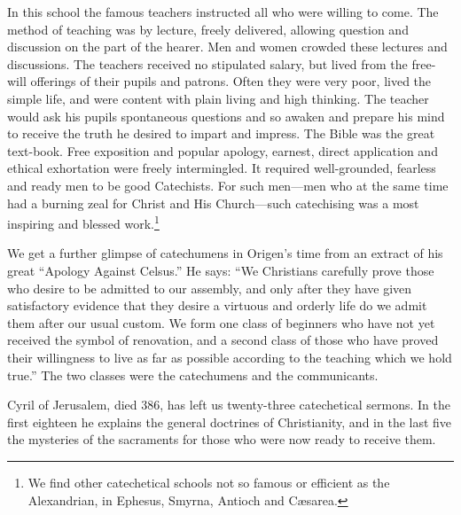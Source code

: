In this school the famous teachers instructed all who were willing to come. The method of teaching was by lecture, freely delivered, allowing question and discussion on the part of the hearer. Men and women crowded these lectures and discussions. The teachers received no stipulated salary, but lived from the free-will offerings of their pupils and patrons. Often they were very poor, lived the simple life, and were content with plain living and high thinking. The teacher would ask his pupils spontaneous questions and so awaken and prepare his mind to receive the truth he desired to impart and impress. The Bible was the great text-book. Free exposition and popular apology, earnest, direct application and ethical exhortation were freely intermingled. It required well-grounded, fearless and ready men to be good Catechists. For such men—men who at the same time had a burning zeal for
Christ and His Church—such catechising was a most inspiring and blessed work.\footnote{We find other catechetical schools not so famous or efficient as the Alexandrian, in Ephesus, Smyrna, Antioch and Cæsarea.}

 We get a further glimpse of catechumens in Origen’s time from an extract of his great “Apology Against Celsus.” He says: “We Christians carefully prove those who desire to be admitted to our assembly, and only after they have given satisfactory evidence that they desire a virtuous and orderly life do we admit them after our usual custom. We form one class of beginners who have not yet received the symbol of renovation, and a second class of those who have proved their willingness to live as far as possible according to the teaching which we hold true.” The two classes were the catechumens and the communicants.

Cyril of Jerusalem, died 386, has left us twenty-three catechetical sermons. In the first eighteen he explains the general doctrines of Christianity, and in the last five the mysteries of the sacraments for those who were now ready to receive them.

